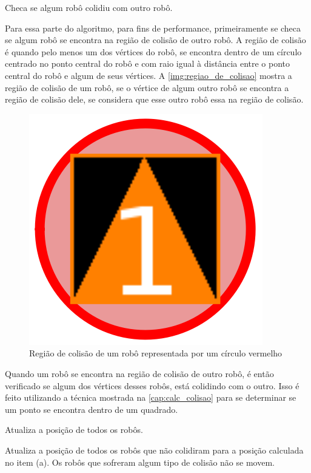 \begin{alineas}[leftmargin=0pt, itemindent=20pt, labelwidth=15pt, labelsep=5pt, listparindent=1.25cm, align=left]
\item Checa se algum robô colidiu com outro robô.

Para essa parte do algoritmo, para fins de performance, primeiramente se checa se algum robô se encontra na região de colisão de outro robô. A região de colisão é quando pelo menos um dos vértices do robô, se encontra dentro de um círculo centrado no ponto central do robô e com raio igual à distância entre o ponto central do robô e algum de seus vértices. A \autoref{img:regiao_de_colisao} mostra a região de colisão de um robô, se o vértice de algum outro robô se encontra a região de colisão dele, se considera que esse outro robô essa na região de colisão.

\begin{figure}[!htb]
    \caption{\label{img:regiao_de_colisao}Região de colisão de um robô representada por um círculo vermelho}
	\begin{center}
        \includegraphics[scale=0.5]{img/zona_de_perigo.png}
	\end{center}
\end{figure}
 
 Quando um robô se encontra na região de colisão de outro robô, é então verificado se algum dos vértices desses robôs, está colidindo com o outro. Isso é feito utilizando a técnica mostrada na \autoref{cap:calc_colisao} para se determinar se um ponto se encontra dentro de um quadrado.
 
 \item Atualiza a posição de todos os robôs.
 
 Atualiza a posição de todos os robôs que não colidiram para a posição calculada no item (a). Os robôs que sofreram algum tipo de colisão não se movem.
 

\end{alineas}
